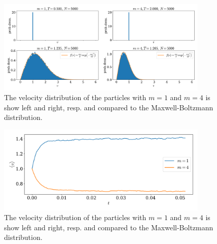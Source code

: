 \documentclass{article}
\begin{document}
            \begin{figure}[h]
                \centering
                \includegraphics[width=0.9\textwidth]{../plots/problem2/vel_dist.pdf}
                \caption{The velocity distribution of the particles with $m=1$ and $m=4$ is show left and right, resp. and compared to the Maxwell-Boltzmann distribution.}
                \label{problem2 dist}
            \end{figure}
            \begin{figure}[h]
                \centering
                \includegraphics[width=0.9\textwidth]{../plots/problem2/v_av.pdf}
                \caption{The velocity distribution of the particles with $m=1$ and $m=4$ is show left and right, resp. and compared to the Maxwell-Boltzmann distribution.}
                \label{problem2 av vel}
            \end{figure}
\end{document}
